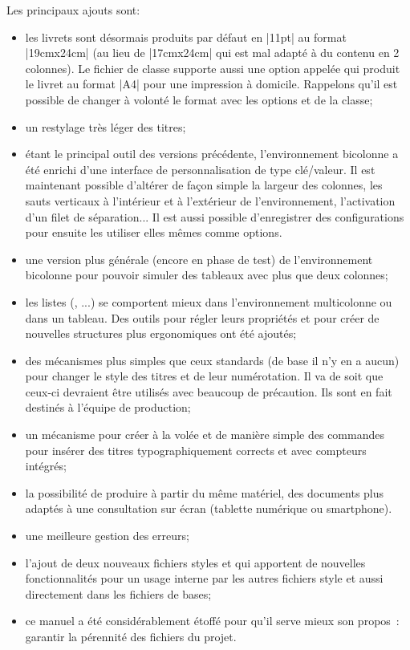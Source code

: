 \documentclass[other,openany]{cpgelvrt}
\let\ENV\env
\renewcommand\env[1]{{\spotcolor\ENV{#1}}}
\let\OPT\opt
\renewcommand\opt[1]{{\spotcolor\OPT{#1}}}
\let\FILE\file
\renewcommand\file[1]{{\color{fs}\FILE{#1}}}
\begin{document}
Les principaux ajouts sont: 
\begin{itemize}
     \item les livrets sont désormais produits par défaut en |11pt| au format |19cmx24cm| (au lieu de |17cmx24cm| qui est mal adapté à du contenu en 2 colonnes). Le fichier de classe supporte aussi une option appelée  qui produit le livret au format |A4| pour une impression à domicile. Rappelons qu'il est possible de changer à volonté le format avec les options  et  de la classe;
     \item  un restylage très léger des titres;
     \item étant le principal outil des versions précédente, l'environnement bicolonne a été enrichi d'une interface de personnalisation  de type clé/valeur. Il est maintenant possible d'altérer de façon simple la largeur des colonnes, les sauts verticaux à l'intérieur et à l'extérieur de l'environnement, l'activation d'un filet de séparation... Il est aussi possible d'enregistrer des configurations pour ensuite les utiliser elles mêmes comme options.
     \item une version plus générale (encore en phase de test) de l'environnement bicolonne pour pouvoir simuler des tableaux avec plus que deux colonnes; 
     \item les listes (, ...) se comportent mieux dans l'environnement multicolonne ou dans un tableau. Des outils pour régler leurs propriétés et pour créer de nouvelles structures plus ergonomiques ont été ajoutés;  
     \item des mécanismes plus simples que ceux standards (de base il n'y en a aucun) pour changer le style des titres et de leur numérotation. Il va de soit que ceux-ci devraient être utilisés avec beaucoup de précaution. Ils sont en fait destinés à l'équipe de production; 
     \item un mécanisme pour créer à la volée et de manière simple des commandes pour insérer des titres typographiquement corrects et avec compteurs intégrés; 
     \item la possibilité de produire à partir du même matériel, des documents plus adaptés à une consultation sur écran (tablette numérique ou smartphone).
     \item une meilleure gestion des erreurs; 
     \item l'ajout de deux nouveaux fichiers styles  et  qui apportent de nouvelles fonctionnalités pour un usage interne par les autres fichiers style et aussi directement dans les fichiers de bases; 
     \item ce manuel a été considérablement étoffé pour qu'il serve mieux son propos~: garantir la pérennité des fichiers du projet.
\end{itemize} 
\end{document}
